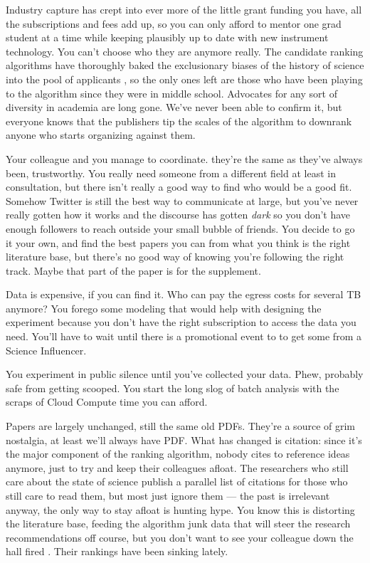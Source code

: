 Industry capture has crept into ever more of the little grant funding
you have, all the subscriptions and fees add up, so you can only afford
to mentor one grad student at a time while keeping plausibly up to date
with new instrument technology. You can't choose who they are anymore
really. The candidate ranking algorithms have thoroughly baked the
exclusionary biases of the history of science into the pool of
applicants\citep{pooleySurveillancePublishing2021, brembsAlgorithmicEmploymentDecisions2021} , so the only ones left are
those who have been playing to the algorithm since they were in middle
school. Advocates for any sort of diversity in academia are long gone.
We've never been able to confirm it, but everyone knows that the
publishers tip the scales of the algorithm to downrank anyone who starts
organizing against them.

Your colleague and you manage to coordinate. they're the same as they've
always been, trustworthy. You really need someone from a different field
at least in consultation, but there isn't really a good way to find who
would be a good fit. Somehow Twitter is still the best way to
communicate at large, but you've never really gotten how it works and
the discourse has gotten \emph{dark} so you don't have enough followers
to reach outside your small bubble of friends. You decide to go it your
own, and find the best papers you can from what you think is the right
literature base, but there's no good way of knowing you're following the
right track. Maybe that part of the paper is for the supplement.

Data is expensive, if you can find it. Who can pay the egress costs for
several TB anymore? You forego some modeling that would help with
designing the experiment because you don't have the right subscription
to access the data you need. You'll have to wait until there is a
promotional event to to get some from a Science Influencer.

You experiment in public silence until you've collected your data. Phew,
probably safe from getting scooped. You start the long slog of batch
analysis with the scraps of Cloud Compute time you can afford.

Papers are largely unchanged, still the same old PDFs. They're a source
of grim nostalgia, at least we'll always have PDF. What has changed is
citation: since it's the major component of the ranking algorithm,
nobody cites to reference ideas anymore, just to try and keep their
colleagues afloat. The researchers who still care about the state of
science publish a parallel list of citations for those who still care to
read them, but most just ignore them --- the past is irrelevant anyway,
the only way to stay afloat is hunting hype. You know this is distorting
the literature base, feeding the algorithm junk data that will steer the
research recommendations off course, but you don't want to see your
colleague down the hall fired \citep{brembsAlgorithmicEmploymentDecisions2021} . Their rankings have been
sinking lately.

